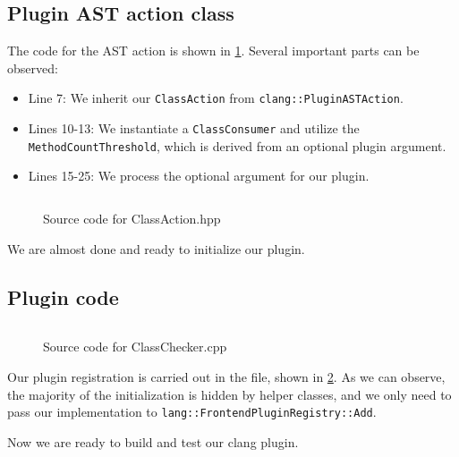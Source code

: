 \subsection{Plugin AST action class}
The code for the AST action is shown in
\cref{lis:ch4:ClassComplexityChecker:Action}. Several important parts can
be observed: 
\begin{itemize}
  \item Line 7: We inherit our \texttt{ClassAction} from
    \texttt{clang::PluginASTAction}. 
  \item Lines 10-13: We instantiate a \texttt{ClassConsumer} and
    utilize the \texttt{MethodCountThreshold}, which is derived from an
    optional plugin argument. 
  \item Lines 15-25: We process the optional  argument for
    our plugin. 
\end{itemize} 
\begin{figure}[H]
  \inputminted{c++}{src/part1/ch4_baselibs/classcomplexity/ClassAction.hpp}
  \caption{Source code for ClassAction.hpp}
  \label{lis:ch4:ClassComplexityChecker:Action}
\end{figure}
We are almost done and ready to initialize our plugin.

\subsection{Plugin code}
\begin{figure}[H]
  \inputminted[highlightlines={16}]{c++}{src/part1/ch4_baselibs/classcomplexity/ClassChecker.cpp}
  \caption{Source code for ClassChecker.cpp}
  \label{lis:ch4:ClassComplexityChecker:Plugin}
\end{figure}
Our plugin registration is carried out in the  file,
shown in \cref{lis:ch4:ClassComplexityChecker:Plugin}. As we can observe, the
majority of the initialization is hidden by helper classes, and we only need to
pass our implementation to \texttt{lang::FrontendPluginRegistry::Add}.

Now we are ready to build and test our clang plugin.

